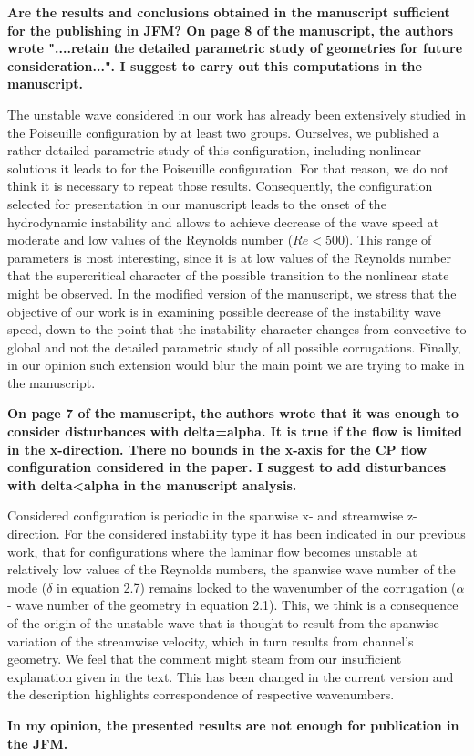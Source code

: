 \documentclass[a4paper,12pt]{article}
\begin{document}
\vspace*{20pt}
{\bf Are the results and conclusions obtained in the manuscript sufficient for the publishing in JFM? On page 8 of the manuscript, the authors wrote "....retain the detailed parametric study of geometries for future consideration...". I suggest to carry out this computations in the manuscript.}
\vspace*{20pt}

The unstable wave considered in our work has already been extensively studied in the Poiseuille configuration by at least two groups. Ourselves, we published a rather detailed parametric study of this configuration, including nonlinear solutions it leads to for the Poiseuille configuration. For that reason, we do not think it is necessary to repeat those results. Consequently, the configuration selected for presentation in our manuscript leads to the onset of the hydrodynamic instability and allows to achieve decrease of the wave speed at moderate and low values of the Reynolds number ($Re<500$). This range of parameters is most interesting, since it is at low values of the Reynolds number that the supercritical character of the possible transition to the nonlinear state might be observed. In the modified version of the manuscript, we stress that the objective of our work is in examining possible decrease of the instability wave speed, down to the point that the instability character changes from convective to global and not the detailed parametric study of all possible corrugations. Finally, in our opinion such extension would blur the main point we are trying to make in the manuscript. 
\vspace*{20pt}

{\bf On page 7 of the manuscript, the authors wrote that it was enough to consider disturbances with delta=alpha. It is true if the flow is limited in the x-direction. There no bounds in the x-axis for the CP flow configuration considered in the paper. I suggest to add disturbances with delta<alpha in the manuscript analysis.}

\vspace*{20pt}
Considered configuration is periodic in the spanwise x- and streamwise z-direction. For the considered instability type it has been indicated in our previous work, that for configurations where the laminar flow becomes unstable at relatively low values of the Reynolds numbers, the spanwise wave number of the mode ($\delta$ in equation 2.7) remains locked to the wavenumber of the corrugation ($\alpha$ - wave number of the geometry in equation 2.1). This, we think is a consequence of the origin of the unstable wave that is thought to result from the spanwise variation of the streamwise velocity, which in turn results from channel’s geometry. We feel that the comment might steam from our insufficient explanation given in the text. This has been changed in the current version and the description highlights correspondence of respective wavenumbers. 
\vspace*{20pt}

{\bf In my opinion, the presented results are not enough for publication in the JFM.}
\end{document}
